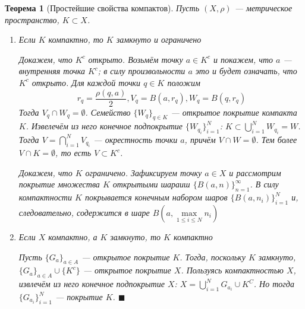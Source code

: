 \documentclass[12pt,a4paper]{article}
\newtheorem*{theorem*}{Теорема}
\begin{document}
\begin{theorem*}[Простейшие свойства компактов]
\label{20.1}
Пусть $(X, \rho)$ --- метрическое пространство, $K \subset X$.
\begin{enumerate}
\item Если $K$ компактно, то $K$ замкнуто и ограничено

Докажем, что $K^c$ открыто. Возьмём точку $a \in K^c$ и покажем, что $a$ --- внутренняя точка $K^c$; в силу произвольности $a$ это и  будет означать, что $K^c$ открыто. Для каждой точки $q \in K$ положим
$$
r_q = \frac{\rho(q, a)}{2}, V_q = B(a, r_q), W_q = B(q, r_q)
$$
Тогда $V_q \cap W_q = \emptyset$. Семейство $\{W_q\}_{q\in K}$ --- открытое покрытие компакта $K$. Извелечём из него конечное подпокрытие $\{W_{q_i}\}_{i=1}^{N}$: $K\subset \bigcup\limits_{i=1}^{N}{W_{q_i}} = W$. Тогда $V = \bigcap\limits_{i=1}^{N}{V_{q_i}}$ --- окрестность точки $a$, причём $V \cap W = \emptyset$. Тем более $V \cap K = \emptyset$, то есть $V \subset K^c$.

Докажем, что $K$ ограничено. Зафиксируем точку $a \in X$ и рассмотрим покрытие множества $K$ открытыми шараиш $\{B(a, n)\}_{n=1}^{\infty}$. В силу компактности $K$ покрывается конечным набором шаров $\{B(a, n_i)\}_{i=1}^{N}$ и, следовательно, содержится в шаре $B\left(a, \max\limits_{1\leq i \leq N}{n_i} \right)$

\item Если $X$ компактно, а $K$ замкнуто, то $K$ компактно

Пусть $\{G_a\}_{a\in A}$ --- открытое покрытие $K$. Тогда, поскольку $K$ замкнуто, $\{G_a\}_{a\in A} \cup\{K^c\}$ --- открытое покрытие $X$. Пользуясь компактностью $X$, извлечём из него конечное подпокрытие $X$: $X=\bigcup\limits_{i=1}^{N}{G_{a_i} \cup K^C}$. Но тогда $\{G_{a_i}\}_{i=1}^{N}$ --- покрытие $K$. $\blacksquare$
\end{enumerate}
\end{theorem*}
\end{document}
